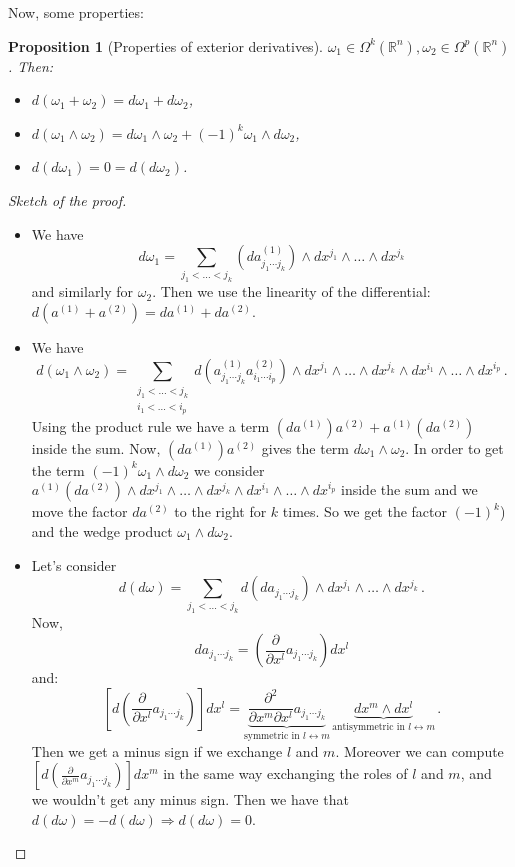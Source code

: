 \documentclass[a4paper,11pt,titlepage, article, oneside]{memoir}
\numberwithin{equation}{section}
\newtheorem{proposition}[theorem]{Proposition}
\theoremstyle{definition}
\theoremstyle{remark}
\newcommand{\rfield}{\mathbb{R}}
\begin{document}
Now, some properties:
\begin{proposition}[Properties of exterior derivatives]
  $\omega_1 \in \Omega^k(\rfield^n), \omega_2 \in \Omega^p(\rfield^n)$. Then:
  \begin{itemize}
    \item $d(\omega_1 +\omega_2) = d\omega_1 + d\omega_2$,
    \item $d(\omega_1 \wedge \omega_2) = d\omega_1 \wedge \omega_2 + (-1)^k \omega_1 \wedge d\omega_2$,
    \item $d(d\omega_1)  = 0 = d(d\omega_2)$.
  \end{itemize}
\end{proposition}
\begin{proof}[Sketch of the proof]
$ $
	\begin{itemize}
	\item We have
	$$d \omega_1 = \sum\limits_{j_1 < \ldots < j_k} \left (d a^{(1)}_{j_1 \cdots j_k} \right) \wedge dx^{j_1} \wedge \ldots \wedge dx^{j_k}$$
	and similarly for $\omega_2$. Then we use the linearity of the differential: $d(a^{(1)} + a^{(2)}) = da^{(1)} + da^{(2)}$.
	\item We have
	$$d(\omega_1 \wedge \omega_2) = \sum\limits_{\substack{j_1 < \ldots < j_k \\ i_1 < \ldots < i_p}} d \left (a^{(1)}_{j_1 \cdots j_k} a^{(2)}_{i_1 \cdots i_p} \right) \wedge dx^{j_1} \wedge \ldots \wedge dx^{j_k} \wedge dx^{i_1} \wedge \ldots \wedge dx^{i_p} \, .$$
	Using the product rule we have a term $\left ( da^{(1)} \right ) a^{(2)} + a^{(1)} \left(da^{(2)}\right)$ inside the sum. Now, $\left( da^{(1)} \right) a^{(2)}$ gives the term $d \omega_1 \wedge \omega_2$. In order to get the term $(-1)^k \omega_1 \wedge d \omega_2$ we consider $a^{(1)}\left(da^{(2)} \right) \wedge dx^{j_1} \wedge \ldots \wedge dx^{j_k} \wedge dx^{i_1} \wedge \ldots \wedge dx^{i_p}$ inside the sum and we move the factor $da^{(2)}$ to the right for $k$ times. So we get the factor $(-1)^k$) and the wedge product $\omega_1 \wedge d \omega_2$.
	\item Let's consider
	$$d(d \omega) = \sum\limits_{j_1 < \ldots < j_k} d \left (da_{j_1 \cdots j_k} \right) \wedge dx^{j_1} \wedge \ldots \wedge dx^{j_k} \, .$$
	Now,
	$$da_{j_1 \cdots j_k} = \left(\frac{\partial}{\partial x^l} a_{j_1 \cdots j_k} \right)dx^l$$
	and:
	$$\left[d \left( \frac{\partial}{\partial x^l} a_{j_1 \cdots j_k}\right) \right] dx^l = \underbrace{\frac{\partial^2}{\partial x^m \partial x^l} a_{j_1 \cdots j_k}}_{\text{symmetric in } l \leftrightarrow m} \, \underbrace{dx^m \wedge dx^l}_{\text{antisymmetric in } l \leftrightarrow m} \, .$$
	Then we get a minus sign if we exchange $l$ and $m$. Moreover we can compute  $\left[d \left( \frac{\partial}{\partial x^m} a_{j_1 \cdots j_k}\right) \right] dx^m$ in the same way exchanging the roles of $l$ and $m$, and we wouldn't get any minus sign. Then we have that $d(d \omega) = -d (d \omega) \Rightarrow d(d \omega) = 0$. \qedhere
	\end{itemize}
\end{proof}
\end{document}
